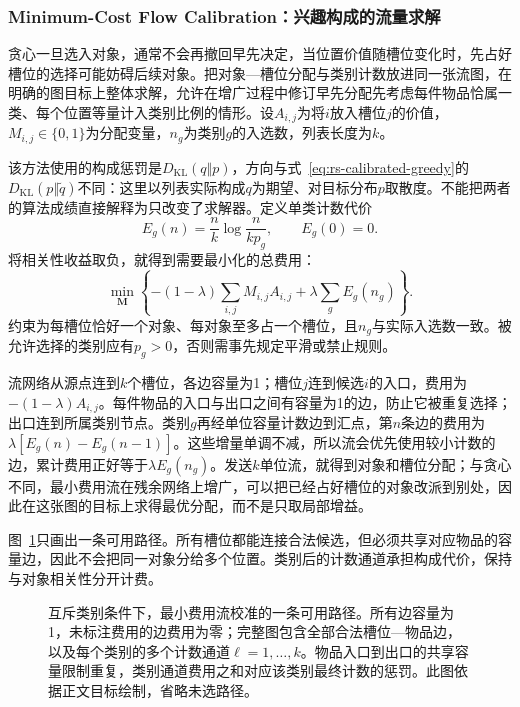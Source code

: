 \subsubsection{Minimum-Cost Flow Calibration：兴趣构成的流量求解}
\label{sec:rs-flow-calibration}

贪心一旦选入对象，通常不会再撤回早先决定，当位置价值随槽位变化时，先占好槽位的选择可能妨碍后续对象。把对象—槽位分配与类别计数放进同一张流图，在明确的图目标上整体求解，允许在增广过程中修订早先分配先考虑每件物品恰属一类、每个位置等量计入类别比例的情形。设$A_{i,j}$为将$i$放入槽位$j$的价值，$M_{i,j}\in\{0,1\}$为分配变量，$n_g$为类别$g$的入选数，列表长度为$k$。

该方法使用的构成惩罚是$D_{\mathrm{KL}}(q\Vert p)$，方向与式~\eqref{eq:rs-calibrated-greedy}的$D_{\mathrm{KL}}(p\Vert\widetilde q)$不同：这里以列表实际构成$q$为期望、对目标分布$p$取散度。不能把两者的算法成绩直接解释为只改变了求解器。定义单类计数代价
\[
 E_g(n)=\frac{n}{k}\log\frac{n}{kp_g},\qquad E_g(0)=0.
\]
将相关性收益取负，就得到需要最小化的总费用：
\begin{equation}
 \min_{\bm M}\left\{
 -(1-\lambda)\sum_{i,j}M_{i,j}A_{i,j}
 +\lambda\sum_g E_g(n_g)\right\}.
 \label{eq:rs-flow-objective}
\end{equation}
约束为每槽位恰好一个对象、每对象至多占一个槽位，且$n_g$与实际入选数一致。被允许选择的类别应有$p_g>0$，否则需事先规定平滑或禁止规则。

流网络从源点连到$k$个槽位，各边容量为1；槽位$j$连到候选$i$的入口，费用为$-(1-\lambda)A_{i,j}$。每件物品的入口与出口之间有容量为1的边，防止它被重复选择；出口连到所属类别节点。类别$g$再经单位容量计数边到汇点，第$n$条边的费用为$\lambda[E_g(n)-E_g(n-1)]$。这些增量单调不减，所以流会优先使用较小计数的边，累计费用正好等于$\lambda E_g(n_g)$。发送$k$单位流，就得到对象和槽位分配；与贪心不同，最小费用流在残余网络上增广，可以把已经占好槽位的对象改派到别处，因此在这张图的目标上求得最优分配，而不是只取局部增益。

图~\ref{fig:rs-calibration-flow}只画出一条可用路径。所有槽位都能连接合法候选，但必须共享对应物品的容量边，因此不会把同一对象分给多个位置。类别后的计数通道承担构成代价，保持与对象相关性分开计费。

\begin{figure}[htbp]
 \centering
 
 \caption{互斥类别条件下，最小费用流校准的一条可用路径。所有边容量为1，未标注费用的边费用为零；完整图包含全部合法槽位—物品边，以及每个类别的多个计数通道$\ell=1,\ldots,k$。物品入口到出口的共享容量限制重复，类别通道费用之和对应该类别最终计数的惩罚。此图依据正文目标绘制，省略未选路径。}
 \label{fig:rs-calibration-flow}
\end{figure}

